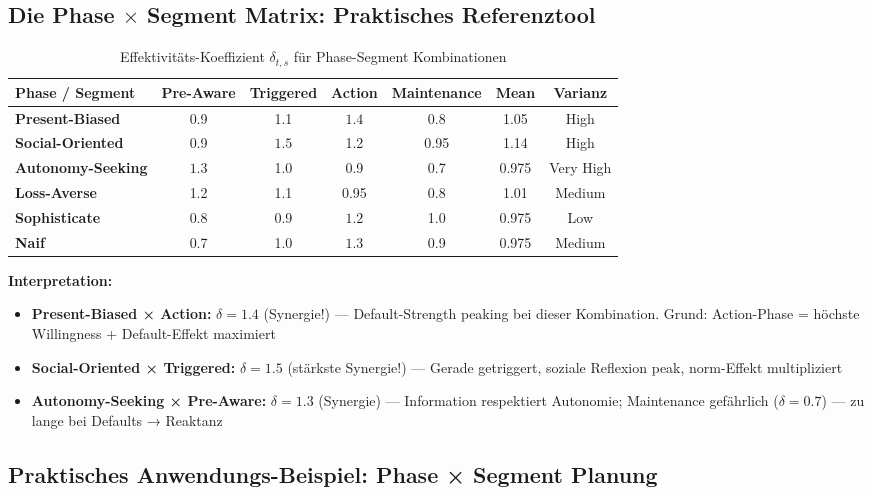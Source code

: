 \subsection{Die Phase $\times$ Segment Matrix: Praktisches Referenztool}

\begin{table}[htbp]
\centering
\caption{Effektivitäts-Koeffizient $\delta_{t,s}$ für Phase-Segment Kombinationen}
\label{tab:19-phase-segment-matrix}
\renewcommand{\arraystretch}{1.3}
\footnotesize
\begin{tabular}{@{}lcccccc@{}}
\toprule
\textbf{Phase / Segment} & \textbf{Pre-Aware} & \textbf{Triggered} & \textbf{Action} & \textbf{Maintenance} & \textbf{Mean} & \textbf{Varianz} \\
\midrule
\textbf{Present-Biased} & 0.9 & 1.1 & \cellcolor{green!25}$1.4$ & 0.8 & 1.05 & High \\
\textbf{Social-Oriented} & 0.9 & \cellcolor{green!25}$1.5$ & 1.2 & 0.95 & 1.14 & High \\
\textbf{Autonomy-Seeking} & \cellcolor{green!25}$1.3$ & 1.0 & 0.9 & 0.7 & 0.975 & Very High \\
\textbf{Loss-Averse} & 1.2 & 1.1 & 0.95 & 0.8 & 1.01 & Medium \\
\textbf{Sophisticate} & 0.8 & 0.9 & \cellcolor{green!25}$1.2$ & 1.0 & 0.975 & Low \\
\textbf{Naif} & 0.7 & 1.0 & \cellcolor{green!25}$1.3$ & 0.9 & 0.975 & Medium \\
\bottomrule
\end{tabular}
\end{table}

\textbf{Interpretation:}

\begin{itemize}[nosep]
\item \textbf{Present-Biased × Action:} $\delta = 1.4$ (Synergie!) — Default-Strength peaking bei dieser Kombination. Grund: Action-Phase = höchste Willingness + Default-Effekt maximiert
\item \textbf{Social-Oriented × Triggered:} $\delta = 1.5$ (stärkste Synergie!) — Gerade getriggert, soziale Reflexion peak, norm-Effekt multipliziert
\item \textbf{Autonomy-Seeking × Pre-Aware:} $\delta = 1.3$ (Synergie) — Information respektiert Autonomie; Maintenance gefährlich ($\delta = 0.7$) — zu lange bei Defaults → Reaktanz
\end{itemize}

\subsection{Praktisches Anwendungs-Beispiel: Phase × Segment Planung}


